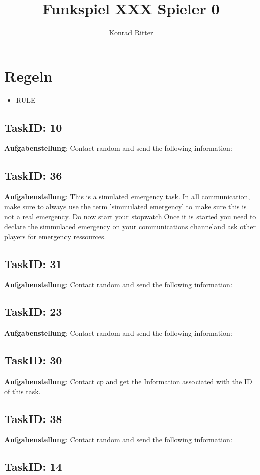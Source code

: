 \documentclass[12pt,a4paper]{scrreprt}
\author{Konrad Ritter}
\title{Funkspiel XXX Spieler 0}
\begin{document}
\maketitle
\section{Regeln}
\begin{itemize}
	\item RULE
\end{itemize}

\subsection{TaskID: 10}
\textbf{Aufgabenstellung}: Contact random and send the following information: \subsection{TaskID: 36}
\textbf{Aufgabenstellung}: This is a simulated emergency task. In all communication, make sure to always use the term 'simmulated emergency' to make sure this is not a real emergency. Do now start your stopwatch.Once it is started you need to declare the simmulated emergency on your communications channeland ask other players for emergency ressources.\subsection{TaskID: 31}
\textbf{Aufgabenstellung}: Contact random and send the following information: \subsection{TaskID: 23}
\textbf{Aufgabenstellung}: Contact random and send the following information: \subsection{TaskID: 30}
\textbf{Aufgabenstellung}: Contact {cp} and get the Information associated with the ID of this task.\subsection{TaskID: 38}
\textbf{Aufgabenstellung}: Contact random and send the following information: \subsection{TaskID: 14}
\end{document}
